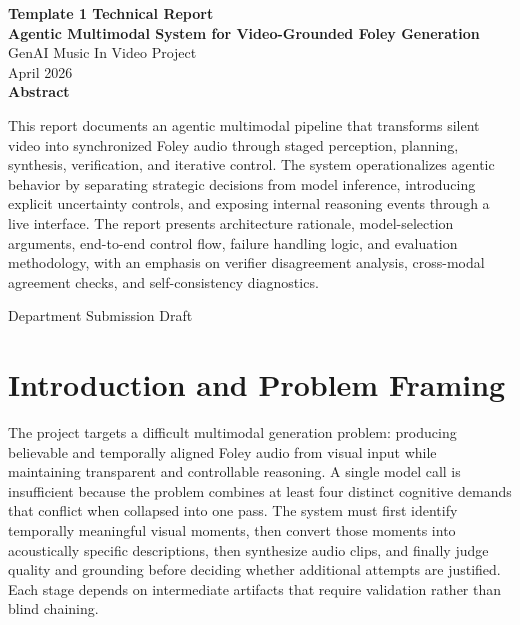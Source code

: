 \documentclass[12pt]{article}
\title{}
\author{}
\date{}
\begin{document}
\begin{titlepage}
\centering
\vspace*{2.8cm}
{\Large \textbf{Template 1 Technical Report}}\\[1.0cm]
{\LARGE \textbf{Agentic Multimodal System for Video-Grounded Foley Generation}}\\[1.2cm]
{\large GenAI Music In Video Project}\\[0.6cm]
{\large April 2026}\\[2.0cm]
{\large \textbf{Abstract}}\\[0.4cm]
\begin{minipage}{0.88\textwidth}
\centering
This report documents an agentic multimodal pipeline that transforms silent video into synchronized Foley audio through staged perception, planning, synthesis, verification, and iterative control. The system operationalizes agentic behavior by separating strategic decisions from model inference, introducing explicit uncertainty controls, and exposing internal reasoning events through a live interface. The report presents architecture rationale, model-selection arguments, end-to-end control flow, failure handling logic, and evaluation methodology, with an emphasis on verifier disagreement analysis, cross-modal agreement checks, and self-consistency diagnostics.
\end{minipage}
\vfill
{\large Department Submission Draft}
\end{titlepage}

\setcounter{page}{1}
\tableofcontents
\newpage
{}
\setcounter{page}{1}

\section{Introduction and Problem Framing}

The project targets a difficult multimodal generation problem: producing believable and temporally aligned Foley audio from visual input while maintaining transparent and controllable reasoning. A single model call is insufficient because the problem combines at least four distinct cognitive demands that conflict when collapsed into one pass. The system must first identify temporally meaningful visual moments, then convert those moments into acoustically specific descriptions, then synthesize audio clips, and finally judge quality and grounding before deciding whether additional attempts are justified. Each stage depends on intermediate artifacts that require validation rather than blind chaining.
\end{document}
